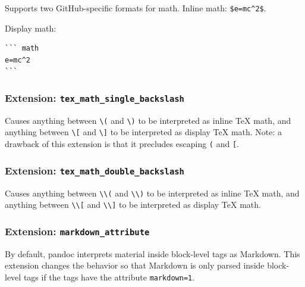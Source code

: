 \documentclass[
]{article}
\begin{document}
Supports two GitHub-specific formats for math. Inline math:
\texttt{\$\textasciigrave{}e=mc\^{}2\textasciigrave{}\$}.

Display math:

\begin{verbatim}
``` math
e=mc^2
```
\end{verbatim}

\hypertarget{extension-tex_math_single_backslash}{%
\subsubsection{\texorpdfstring{Extension:
\texttt{tex\_math\_single\_backslash}}{Extension: tex\_math\_single\_backslash}}\label{extension-tex_math_single_backslash}}

Causes anything between \texttt{\textbackslash{}(} and
\texttt{\textbackslash{})} to be interpreted as inline TeX math, and
anything between \texttt{\textbackslash{}{[}} and
\texttt{\textbackslash{}{]}} to be interpreted as display TeX math.
Note: a drawback of this extension is that it precludes escaping
\texttt{(} and \texttt{{[}}.

\hypertarget{extension-tex_math_double_backslash}{%
\subsubsection{\texorpdfstring{Extension:
\texttt{tex\_math\_double\_backslash}}{Extension: tex\_math\_double\_backslash}}\label{extension-tex_math_double_backslash}}

Causes anything between \texttt{\textbackslash{}\textbackslash{}(} and
\texttt{\textbackslash{}\textbackslash{})} to be interpreted as inline
TeX math, and anything between
\texttt{\textbackslash{}\textbackslash{}{[}} and
\texttt{\textbackslash{}\textbackslash{}{]}} to be interpreted as
display TeX math.

\hypertarget{extension-markdown_attribute}{%
\subsubsection{\texorpdfstring{Extension:
\texttt{markdown\_attribute}}{Extension: markdown\_attribute}}\label{extension-markdown_attribute}}

By default, pandoc interprets material inside block-level tags as
Markdown. This extension changes the behavior so that Markdown is only
parsed inside block-level tags if the tags have the attribute
\texttt{markdown=1}.
\end{document}
